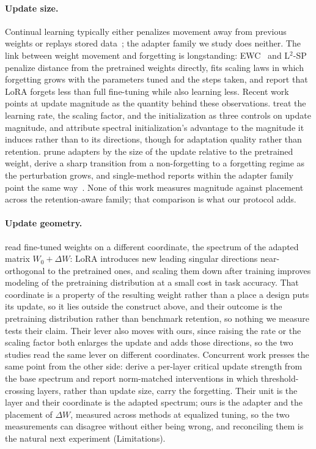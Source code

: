 \documentclass[11pt]{article}
\begin{document}
\paragraph{Update size.} Continual learning typically either penalizes
movement away from previous weights or replays stored
data~\citep{wang2024clsurvey,rolnick2019replay}; the adapter family we study
does neither. The link between weight movement and forgetting is
longstanding: EWC~\citep{kirkpatrick2017ewc} and L$^2$-SP~\citep{li2018l2sp}
penalize distance from the pretrained weights directly,
\citet{kalajdzievski2024scaling} fits scaling laws in which forgetting grows
with the parameters tuned and the steps taken, and \citet{biderman2024lora}
report that LoRA forgets less than full fine-tuning while also learning
less. Recent work points at update magnitude as the quantity behind these
observations. \citet{zhang2025primacy} treat the learning rate, the scaling
factor, and the initialization as three controls on update magnitude, and
attribute spectral initialization's advantage to the magnitude it induces
rather than to its directions, though for adaptation quality rather than
retention. \citet{huang2025fapm} prune adapters by the size of the update
relative to the pretrained weight, \citet{koubbi2026meanfield} derive a
sharp transition from a non-forgetting to a forgetting regime as the
perturbation grows, and single-method reports within the adapter family
point the same way~\citep{wang2024milora,tang2025loranull}. None of this
work measures magnitude against placement across the retention-aware
family; that comparison is what our protocol adds.

\paragraph{Update geometry.} \citet{shuttleworth2025illusion} read fine-tuned
weights on a different coordinate, the spectrum of the adapted matrix
$W_0{+}\Delta W$: LoRA introduces new leading singular directions
near-orthogonal to the pretrained ones, and scaling them down after training
improves modeling of the pretraining distribution at a small cost in task
accuracy. That coordinate is a property of the resulting weight rather than a place a
design puts its update, so it lies outside the construct above, and their
outcome is the pretraining distribution rather than benchmark retention, so
nothing we measure tests their claim. Their lever also
moves with ours, since raising the rate or the scaling factor both enlarges
the update and adds those directions, so the two studies read the same
lever on different coordinates. Concurrent work presses the same point from
the other side: \citet{xie2026intruder} derive a per-layer critical update
strength from the base spectrum and report norm-matched interventions in which
threshold-crossing layers, rather than update size, carry the forgetting.
Their unit is the layer and their coordinate is the adapted spectrum; ours is
the adapter and the placement of $\Delta W$, measured across methods at
equalized tuning, so the two measurements can disagree without either being
wrong, and reconciling them is the natural next experiment (Limitations).
\end{document}
